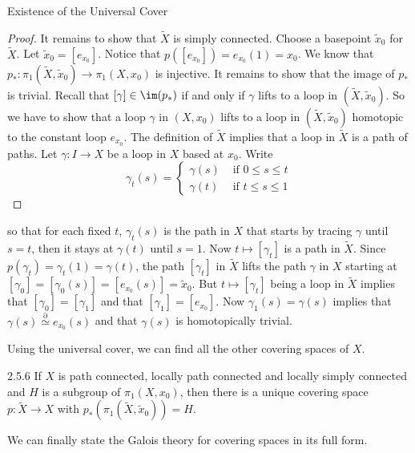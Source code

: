 \documentclass[a4paper]{article}
\begin{document}
\begin{thm}{Existence of the Universal Cover}{}
\begin{proof}
It remains to show that $\widetilde{X}$ is simply connected. Choose a basepoint $\widetilde{x}_0$ for $\widetilde{X}$. Let $\widetilde{x}_0=[e_{x_0}]$. Notice that $p\left([e_{x_0}]\right)=e_{x_0}(1)=x_0$. We know that $p_\ast:\pi_1(\widetilde{X},\widetilde{x}_0)\to\pi_1(X,x_0)$ is injective. It remains to show that the image of $p_\ast$ is trivial. Recall that $[\gamma]\in\im(p_\ast)$ if and only if $\gamma$ lifts to a loop in $(\widetilde{X},\widetilde{x}_0)$. So we have to show that a loop $\gamma$ in $(X,x_0)$ lifts to a loop in $(\widetilde{X},\widetilde{x}_0)$ homotopic to the constant loop $e_{x_0}$. The definition of $\widetilde{X}$ implies that a loop in $\widetilde{X}$ is a path of paths. Let $\gamma:I\to X$ be a loop in $X$ based at $x_0$. Write $$\gamma_t(s)=\begin{cases}
\gamma(s) & \text{ if }0\leq s\leq t\\
\gamma(t) & \text{ if }t\leq s\leq 1
\end{cases}$$
\end{proof}
so that for each fixed $t$, $\gamma_t(s)$ is the path in $X$ that starts by tracing $\gamma$ until $s=t$, then it stays at $\gamma(t)$ until $s=1$. Now $t\mapsto[\gamma_t]$ is a path in $\widetilde{X}$. Since $p(\gamma_t)=\gamma_t(1)=\gamma(t)$, the path $[\gamma_t]$ in $\widetilde{X}$ lifts the path $\gamma$ in $X$ starting at $[\gamma_0]=[\gamma_0(s)]=[e_{x_0}(s)]=\widetilde{x}_0$. But $t\mapsto[\gamma_t]$ being a loop  in $\widetilde{X}$ implies that $[\gamma_0]=[\gamma_1]$ and that $[\gamma_1]=[e_{x_0}]$. Now $\gamma_1(s)=\gamma(s)$ implies that $\gamma(s)\overset{\partial}{\simeq}e_{x_0}(s)$ and that $\gamma(s)$ is homotopically trivial. 
\end{thm}

Using the universal cover, we can find all the other covering spaces of $X$. 

\begin{thm}{}{2.5.6} If $X$ is path connected, locally path connected and locally simply connected and $H$ is a subgroup of $\pi_1(X,x_0)$, then there is a unique covering space $p:\widetilde{X}\to X$ with $p_\ast(\pi_1(\widetilde{X},\widetilde{x}_0))=H$. 
\end{thm}

We can finally state the Galois theory for covering spaces in its full form. 
\end{document}
